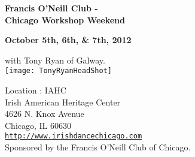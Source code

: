 \vspace{0pt}
\begin{center}
{\Large\textbf{Francis O'Neill Club -\\ Chicago Workshop Weekend}}\\ 
\end{center}

\begin{center}
\textbf{October 5th, 6th, \&  7th, 2012}\\ 
\end{center}

\vspace*{0.25em}
with Tony Ryan of Galway.\\

\vspace*{0.5em}
\texttt{[image: TonyRyanHeadShot]}

\vspace*{0.5em}
Location : IAHC\\
Irish American Heritage Center\\
4626 N. Knox Avenue\\
Chicago, IL  60630 \\

\href{http://www.irishdancechicago.com}{\tt http://www.irishdancechicago.com} \\

{\small Sponsored by the Francis O'Neill Club of Chicago.}
